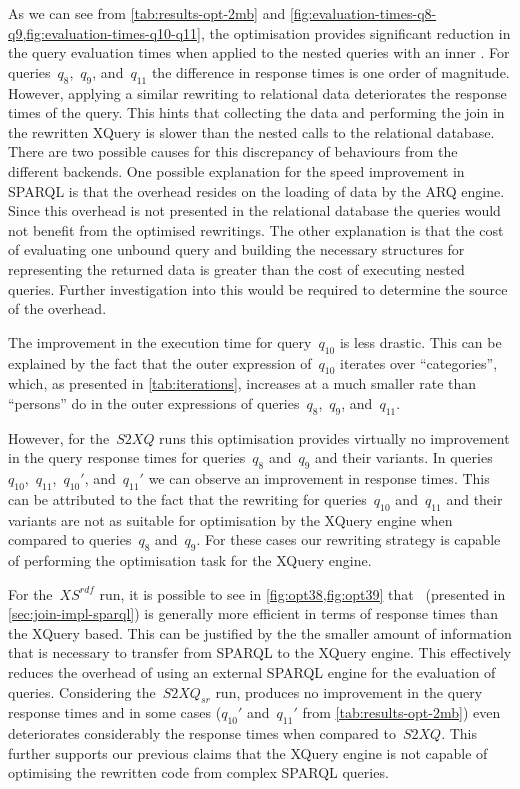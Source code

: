 As we can see from \cref{tab:results-opt-2mb} and \cref{fig:evaluation-times-q8-q9,fig:evaluation-times-q10-q11}, the
 optimisation provides significant reduction in the query evaluation times when applied to the nested
queries with an inner \SparqlForClause.  For queries~$q_{8}$,~$q_{9}$, and~$q_{11}$ the difference in response times is
one order of magnitude.
%
However, applying a similar rewriting to relational data deteriorates the response times of the query.  This hints that
collecting the data and performing the join in the rewritten XQuery is slower than the nested calls to the relational
database.  
%
There are two possible causes for this discrepancy of behaviours from the different backends.  One possible explanation
for the speed improvement in SPARQL is that the overhead resides on the loading of data by the ARQ engine.  Since this
overhead is not presented in the relational database the queries would not benefit from the optimised rewritings.
%
The other explanation is that the cost of evaluating one unbound query and building the necessary structures for
representing the returned data is greater than the cost of executing nested queries.
%
Further investigation into this would be required to determine the source of the overhead.
%

The improvement in the execution time for query~$q_{10}$ is less drastic. This can be explained by the fact that the
outer expression of~$q_{10}$ iterates over ``categories'', which, as presented in \cref{tab:iterations}, increases at a
much smaller rate than ``persons'' do in the outer expressions of queries~$q_8$,~$q_9$, and~$q_{11}$.


However, for the~$\mathit{S2XQ}$ runs this optimisation provides virtually no improvement in the query response times
for queries~$q_8$ and~$q_9$ and their variants.  In queries~$q_{10}$,~$q_{11}$,~$q_{10}'$, and~$q_{11}'$ we can observe
an improvement in response times. This can be attributed to the fact that the rewriting for queries~$q_{10}$
and~$q_{11}$ and their variants are not as suitable for optimisation by the XQuery engine when compared to queries~$q_8$
and~$q_9$. For these cases our rewriting strategy is capable of performing the optimisation task for the XQuery engine.


For the~$\mathit{XS^{rdf}}$ run, it is possible to see in \cref{fig:opt38,fig:opt39} that~ (presented
in \cref{sec:join-impl-sparql}) is generally more efficient in terms of response times than the XQuery based.
%
This can be justified by the the smaller amount of information that is necessary to transfer from SPARQL to the XQuery
engine.  This effectively reduces the overhead of using an external SPARQL engine for the evaluation of queries.
%
Considering the~$\mathit{S2XQ_{sr}}$ run,  produces no improvement in the
query response times and in some cases ($q_{10}'$ and~$q_{11}'$ from \cref{tab:results-opt-2mb}) even deteriorates
considerably the response times when compared to~$\mathit{S2XQ}$.  This further supports our previous
claims that the XQuery engine is not capable of optimising the rewritten code from complex SPARQL queries.


